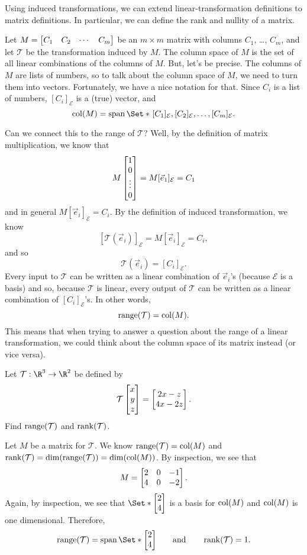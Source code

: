 Using induced transformations, we can extend linear-transformation definitions to matrix definitions.
In particular, we can define the rank and nullity of a matrix.


Let $M=\mat{C_1&C_2&\cdots &C_m}$ be an $m\times m$ matrix with columns $C_1$, \ldots, $C_m$, and let $\mathcal T$ be 
the transformation induced by $M$. The column space of $M$ is the set of all linear combinations of the columns of
$M$. But, let's be precise. The columns of $M$ are lists of numbers, so to talk about the column space of $M$,
we need to turn them into vectors. Fortunately, we have a nice notation for that. Since $C_i$ is a list of numbers,
$[C_i]_{\mathcal E}$ is a (true) vector, and
\[
	\Col(M)=\Span\Set*{\hspace{1pt}[C_1]_{\mathcal E},[C_2]_{\mathcal E},\ldots,[C_m]_{\mathcal E}}.
\]

Can we connect this to the range of $\mathcal T$? Well, by the definition of matrix multiplication, we know that
\[
	M\begin{bmatrix}1\\0\\\vdots\\0\end{bmatrix}=M[\vec e_1]_{\mathcal E} = C_1
\]
and in general $M[\vec e_i]_{\mathcal E}=C_i$. By the definition of induced transformation, we know
\[
	[\mathcal T(\vec e_i)]_{\mathcal E} = M[\vec e_i]_{\mathcal E} = C_i,
\]
and so
\[
	\mathcal T(\vec e_i)= [C_i]_{\mathcal E}.
\]
Every input to $\mathcal T$ can be written as a linear combination of $\vec e_i$'s (because $\mathcal E$ is a basis)
and so, because $\mathcal T$ is linear, every output of $\mathcal T$ can be written as a linear combination of $[C_i]_{\mathcal E}$'s.
In other words,
\[
	\operatorname{range}(\mathcal T)=\operatorname{col}(M).
\]
This means that when trying to answer a question about the range of a linear transformation, we could think about
the column space of its matrix instead (or vice versa). 

\begin{example}
	Let $\mathcal T:\R^3\to\R^2$ be defined by
	\[
		\mathcal T\mat{x\\y\\z} = \matc{2x-z\\4x-2z}.
	\]
	Find $\operatorname{range}(\mathcal T)$ and $\operatorname{rank}(\mathcal T)$.

	\medskip
	Let $M$ be a matrix for $\mathcal T$. We know $\operatorname{range}(\mathcal T)=\operatorname{col}(M)$ and $\operatorname{rank}(\mathcal T)=\operatorname{dim}(\operatorname{range}(\mathcal T))
	=\operatorname{dim}(\operatorname{col}(M))$. By inspection, we see that
	\[
		M=\mat{2&0&-1\\4&0&-2}.
	\]
	Again, by inspection, we see that $\Set*{\mat{2\\4}}$ is a basis for $\operatorname{col}(M)$ and $\operatorname{col}(M)$ is one dimensional.
	Therefore,
	\[
		\Range(\mathcal T) = \Span\Set*{\mat{2\\4}}\qquad \text{and}\qquad \Rank(\mathcal T)=1.
	\]
\end{example}

